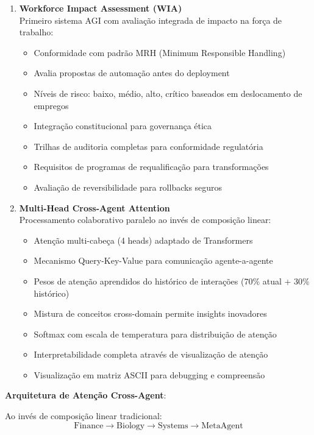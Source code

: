 \documentclass[11pt]{article}
\begin{document}
\begin{enumerate}
    \item \textbf{Workforce Impact Assessment (WIA)} \\
    Primeiro sistema AGI com avaliação integrada de impacto na força de trabalho:
    \begin{itemize}
        \item Conformidade com padrão MRH (Minimum Responsible Handling)
        \item Avalia propostas de automação antes do deployment
        \item Níveis de risco: baixo, médio, alto, crítico baseados em deslocamento de empregos
        \item Integração constitucional para governança ética
        \item Trilhas de auditoria completas para conformidade regulatória
        \item Requisitos de programas de requalificação para transformações
        \item Avaliação de reversibilidade para rollbacks seguros
    \end{itemize}

    \item \textbf{Multi-Head Cross-Agent Attention} \\
    Processamento colaborativo paralelo ao invés de composição linear:
    \begin{itemize}
        \item Atenção multi-cabeça (4 heads) adaptado de Transformers
        \item Mecanismo Query-Key-Value para comunicação agente-a-agente
        \item Pesos de atenção aprendidos do histórico de interações (70\% atual + 30\% histórico)
        \item Mistura de conceitos cross-domain permite insights inovadores
        \item Softmax com escala de temperatura para distribuição de atenção
        \item Interpretabilidade completa através de visualização de atenção
        \item Visualização em matriz ASCII para debugging e compreensão
    \end{itemize}
\end{enumerate}

\textbf{Arquitetura de Atenção Cross-Agent}:

Ao invés de composição linear tradicional:
\begin{equation}
\text{Finance} \rightarrow \text{Biology} \rightarrow \text{Systems} \rightarrow \text{MetaAgent}
\end{equation}
\end{document}
